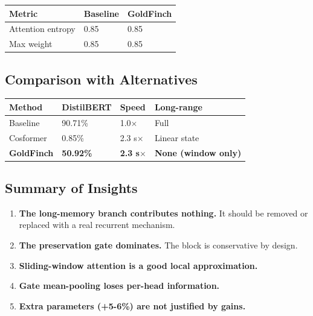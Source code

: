 \begin{table}[H]
\centering
\small
\begin{tabular}{lll}
\toprule
\textbf{Metric} & \textbf{Baseline} & \textbf{GoldFinch} \\
\midrule
Attention entropy & 0.85 & 0.85 \\
Max weight & 0.85 & 0.85 \\
\bottomrule
\end{tabular}
\end{table}

\subsection{Comparison with Alternatives}

\begin{table}[H]
\centering
\small
\begin{tabular}{llll}
\toprule
\textbf{Method} & \textbf{DistilBERT} & \textbf{Speed} & \textbf{Long-range} \\
\midrule
Baseline & 90.71\% & 1.0$\times$ & Full \\
Cosformer & 0.85\% & 2.3 s$\times$ & Linear state \\
\textbf{GoldFinch} & \textbf{50.92\%} & \textbf{2.3 s$\times$} & \textbf{None (window only)} \\
\bottomrule
\end{tabular}
\end{table}

\subsection{Summary of Insights}

\begin{enumerate}
\item \textbf{The long-memory branch contributes nothing.} It should be removed or
  replaced with a real recurrent mechanism.
\item \textbf{The preservation gate dominates.} The block is conservative by design.
\item \textbf{Sliding-window attention is a good local approximation.}
\item \textbf{Gate mean-pooling loses per-head information.}
\item \textbf{Extra parameters (+5-6\%) are not justified by gains.}

\end{enumerate}



